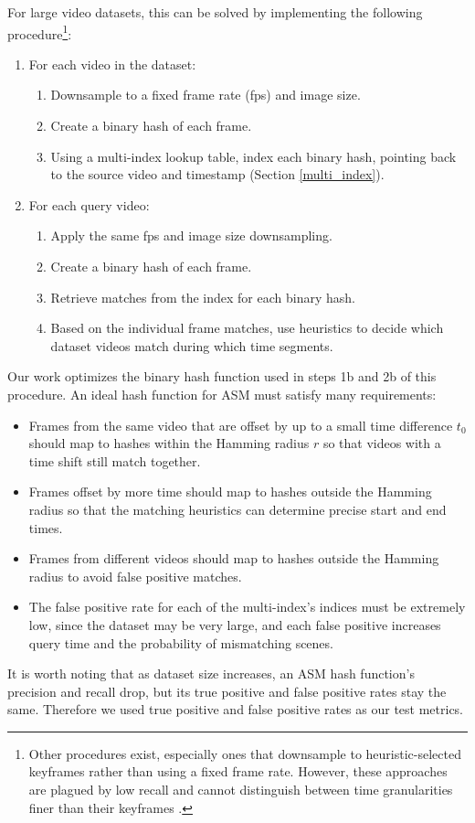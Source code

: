 \documentclass{article}
\begin{document}
\begin{multicols}{2}
For large video datasets, this can be solved by implementing the following procedure\footnote{
Other procedures exist, especially ones that downsample to heuristic-selected keyframes rather than using a fixed frame rate.
However, these approaches are plagued by low recall and cannot distinguish between time granularities finer than their keyframes \cite{cbvr15}.
}:
\begin{enumerate}
\item For each video in the dataset:
\begin{enumerate}
\item Downsample to a fixed frame rate (fps) and image size.
\item Create a binary hash of each frame.
\item Using a multi-index lookup table, index each binary hash, pointing back to the source video and timestamp (Section \ref{multi_index}).
\end{enumerate}
\item For each query video:
\begin{enumerate}
\item Apply the same fps  and image size downsampling.
\item Create a binary hash of each frame.
\item Retrieve matches from the index for each binary hash.
\item Based on the individual frame matches, use heuristics to decide which dataset videos match during which time segments.
\end{enumerate}
\end{enumerate}

Our work optimizes the binary hash function used in steps 1b and 2b of this procedure. An ideal hash function for ASM must satisfy many requirements:
\begin{itemize}
\item Frames from the same video that are offset by up to a small time difference $t_0$ should map to hashes within the Hamming radius $r$ so that videos with a time shift still match together.
\item Frames offset by more time should map to hashes outside the Hamming radius so that the matching heuristics can determine precise start and end times.
\item Frames from different videos should map to hashes outside the Hamming radius to avoid false positive matches.
\item The false positive rate for each of the multi-index's indices must be extremely low, since the dataset may be very large, and each false positive increases query time and the probability of mismatching scenes.
\end{itemize}
It is worth noting that as dataset size increases, an ASM hash function's precision and recall drop, but its true positive and false positive rates stay the same.
Therefore we used true positive and false positive rates as our test metrics.


\end{multicols}
\end{document}

